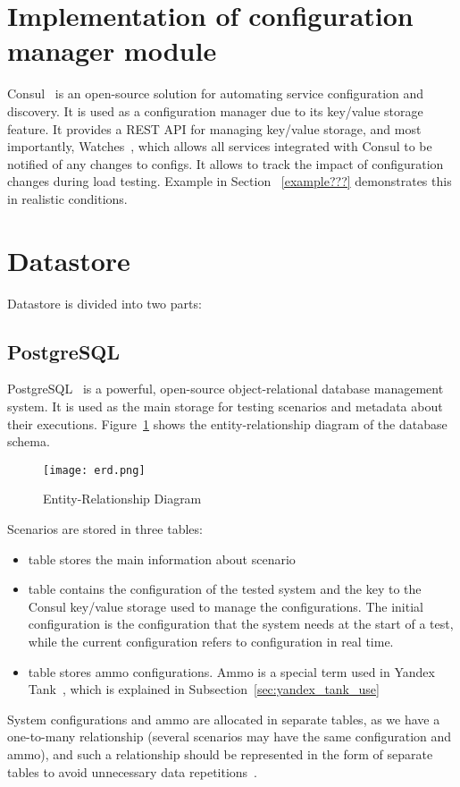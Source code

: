 \section{Implementation of configuration manager module}
Consul~\cite{consul} is an open-source solution for automating service configuration and discovery. It is used as a configuration manager due to its key/value storage feature. It provides a REST API for managing key/value storage, and most importantly, Watches~\cite{consul_watches}, which allows all services integrated with Consul to be notified of any changes to configs. It allows to track the impact of configuration changes during load testing. Example in Section ~\ref{example???} demonstrates this in realistic conditions.


\section{Datastore}\label{sec:implementation-of-datastore}
Datastore is divided into two parts:

\subsection{PostgreSQL}\label{subsec:postgresql}
PostgreSQL~\cite{postgresql} is a powerful, open-source object-relational database management system. It is used as the main storage for testing scenarios and metadata about their executions. Figure~\ref{fig:erd} shows the entity-relationship diagram of the database schema.
\begin{figure}[t]
    \centering
    \texttt{[image: erd.png]}
    \caption{Entity-Relationship Diagram}
    \label{fig:erd}
\end{figure}

Scenarios are stored in three tables:
\begin{itemize}
    \item {} table stores the main information about scenario
    \item {} table contains the configuration of the tested system and the key to the Consul key/value storage used to manage the configurations. The initial configuration is the configuration that the system needs at the start of a test, while the current configuration refers to configuration in real time.
    \item {} table stores ammo configurations. Ammo is a special term used in Yandex Tank~\cite{yandex_tank}, which is explained in Subsection~\ref{sec:yandex_tank_use}
\end{itemize}
System configurations and ammo are allocated in separate tables, as we have a one-to-many relationship (several scenarios may have the same configuration and ammo), and such a relationship should be represented in the form of separate tables to avoid unnecessary data repetitions~\cite{normal_forms}.

